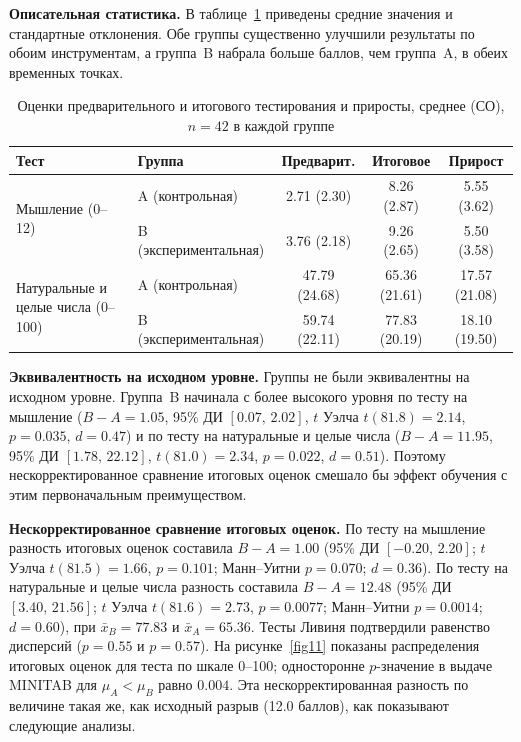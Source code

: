 \documentclass[a4paper,14pt]{extreport}
\theoremstyle{plain}
\theoremstyle{definition}
\theoremstyle{remark}
\begin{document}
\textbf{Описательная статистика.}
В таблице~\ref{tab:descriptive} приведены средние значения и стандартные отклонения. Обе группы существенно улучшили результаты по обоим инструментам, а группа~B набрала больше баллов, чем группа~A, в обеих временных точках.

\begin{table}[ht!]
	\centering
	\caption{Оценки предварительного и итогового тестирования и приросты, среднее (СО), $n=42$ в каждой группе}
	\label{tab:descriptive}
	\small
	\setlength{\tabcolsep}{4pt}
	\renewcommand{\arraystretch}{1.3}
	\begin{tabular}{|p{4.0cm}|l|c|c|c|}
		\hline
		\textbf{Тест} & \textbf{Группа} & \textbf{Предварит.} & \textbf{Итоговое} & \textbf{Прирост} \\ \hline
		\multirow{2}{4.0cm}{Мышление (0--12)} & A (контрольная) & 2.71 (2.30) & 8.26 (2.87) & 5.55 (3.62) \\ \cline{2-5}
		& B (экспериментальная) & 3.76 (2.18) & 9.26 (2.65) & 5.50 (3.58) \\ \hline
		\multirow{2}{4.0cm}{Натуральные и целые числа (0--100)} & A (контрольная) & 47.79 (24.68) & 65.36 (21.61) & 17.57 (21.08) \\ \cline{2-5}
		& B (экспериментальная) & 59.74 (22.11) & 77.83 (20.19) & 18.10 (19.50) \\ \hline
	\end{tabular}
\end{table}

\textbf{Эквивалентность на исходном уровне.}
Группы не были эквивалентны на исходном уровне. Группа~B начинала с более высокого уровня по тесту на мышление ($B-A=1.05$, 95\% ДИ $[0.07,\,2.02]$, $t$ Уэлча $t(81.8)=2.14$, $p=0.035$, $d=0.47$) и по тесту на натуральные и целые числа ($B-A=11.95$, 95\% ДИ $[1.78,\,22.12]$, $t(81.0)=2.34$, $p=0.022$, $d=0.51$). Поэтому нескорректированное сравнение итоговых оценок смешало бы эффект обучения с этим первоначальным преимуществом.

\textbf{Нескорректированное сравнение итоговых оценок.}
По тесту на мышление разность итоговых оценок составила $B-A=1.00$ (95\% ДИ $[-0.20,\,2.20]$; $t$ Уэлча $t(81.5)=1.66$, $p=0.101$; Манн--Уитни $p=0.070$; $d=0.36$). По тесту на натуральные и целые числа разность составила $B-A=12.48$ (95\% ДИ $[3.40,\,21.56]$; $t$ Уэлча $t(81.6)=2.73$, $p=0.0077$; Манн--Уитни $p=0.0014$; $d=0.60$), при $\bar{x}_B=77.83$ и $\bar{x}_A=65.36$. Тесты Ливиня подтвердили равенство дисперсий ($p=0.55$ и $p=0.57$). На рисунке~\ref{fig11} показаны распределения итоговых оценок для теста по шкале 0--100; односторонне $p$-значение в выдаче MINITAB для $\mu_A<\mu_B$ равно $0.004$. Эта нескорректированная разность по величине такая же, как исходный разрыв (12.0 баллов), как показывают следующие анализы.
\end{document}
